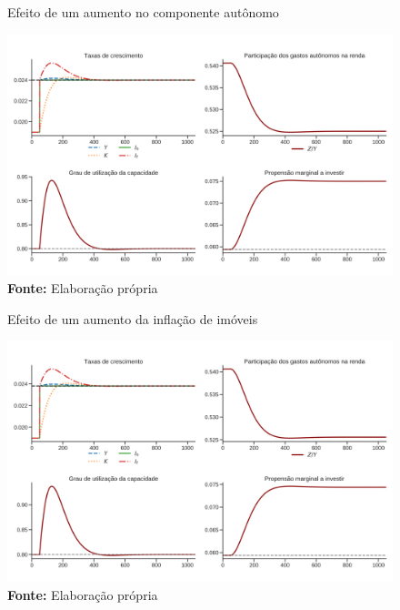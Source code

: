 \begin{figure}[H]
	\centering
	\caption{Efeito de um aumento no componente autônomo}
	\label{choque_1}
	\includegraphics[width=\textwidth]{../../Modelo/Versoes/Shock_1.png}
	\caption*{\textbf{Fonte:} Elaboração própria}
\end{figure}


\begin{figure}[H]
	\centering
	\caption{Efeito de um aumento da inflação de imóveis}
	\label{choque_4}
	\includegraphics[width=\textwidth]{../../Modelo/Versoes/Shock_4.png}
	\caption*{\textbf{Fonte:} Elaboração própria}
\end{figure}

